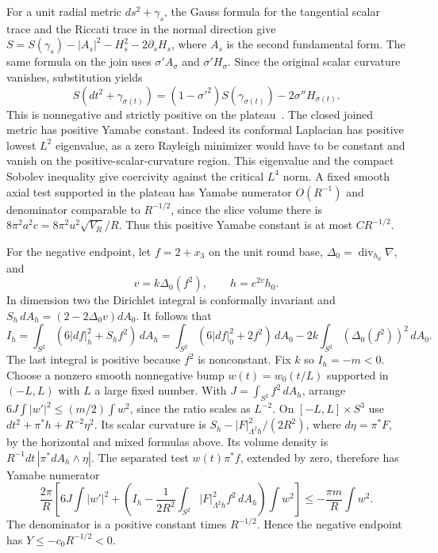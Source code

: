 \documentclass[11pt]{article}
\numberwithin{equation}{section}
\theoremstyle{definition}
\theoremstyle{remark}
\begin{document}
For a unit radial metric \(ds^2+\gamma_s\), the Gauss formula
for the tangential scalar trace and the Riccati trace in the
normal direction give \(S=S(\gamma_s)-|A_s|^2-H_s^2-2\partial_s H_s\),
where \(A_s\) is the second fundamental form. The same formula
on the join uses \(\sigma'A_{\sigma}\) and \(\sigma'H_\sigma\).
Since the original scalar curvature vanishes, substitution yields
\[
 S(dt^2+\gamma_{\sigma(t)})
   =(1-\sigma'^2)S(\gamma_{\sigma(t)})-2\sigma''H_{\sigma(t)} .
\]
This is nonnegative and strictly positive on the plateau~\cite[Lemma 2.4]{EbertFrenck2021Surgery}.
The closed joined metric has positive Yamabe constant. Indeed
its conformal Laplacian has positive lowest \(L^2\) eigenvalue,
as a zero Rayleigh minimizer would have to be constant and
vanish on the positive-scalar-curvature region. This eigenvalue
and the compact Sobolev inequality give coercivity against the
critical \(L^4\) norm. A fixed smooth axial test supported in
the plateau has Yamabe numerator \(O(R^{-1})\) and denominator
comparable to \(R^{-1/2}\), since the slice volume there is
\(8\pi^2 a^2c=8\pi^2u^2\sqrt{V_R}/R\). Thus this positive
Yamabe constant is at most \(C R^{-1/2}\).

For the negative endpoint, let \(f=2+x_3\) on the unit round
base, \(\Delta_0=\operatorname{div}_{h_0}\nabla\), and
\[
 v=k\Delta_0(f^2),\qquad h=e^{2v}h_0.
\]
In dimension two the Dirichlet integral is conformally invariant
and \(S_h\,dA_h=(2-2\Delta_0v)dA_0\). It follows that
\[
 I_h=\int_{S^2}(6|df|_h^2+S_h f^2)\,dA_h
 =\int_{S^2}(6|df|_0^2+2f^2)\,dA_0
       -2k\int_{S^2}(\Delta_0(f^2))^2\,dA_0 .
\]
The last integral is positive because \(f^2\) is nonconstant.
Fix \(k\) so \(I_h=-m<0\). Choose a nonzero smooth nonnegative
bump \(w(t)=w_0(t/L)\) supported in \((-L,L)\) with \(L\) a
large fixed number. With \(J=\int_{S^2}f^2\,dA_h\), arrange
\(6J\int|w'|^2\le(m/2)\int w^2\), since the ratio scales as \(L^{-2}\).
On \([-L,L]\times S^3\) use
\(dt^2+\pi^*h+R^{-2}\eta^2\). Its scalar curvature is
\(S_h-|F|_{\Lambda^2 h}^2/(2R^2)\), where \(d\eta=\pi^*F\), by the
horizontal and mixed formulas above. Its volume density is
\(R^{-1}dt\,|\pi^*dA_h\wedge\eta|\). The separated test
\(w(t)\pi^*f\), extended by zero, therefore has Yamabe numerator
\[
 \frac{2\pi}{R}\left[
  6J\int |w'|^2+
   \left(I_h-\frac1{2R^2}\int_{S^2}|F|_{\Lambda^2 h}^2 f^2\,dA_h\right)
       \int w^2\right]
 \le -\frac{\pi m}{R}\int w^2 .
\]
The denominator is a positive constant times \(R^{-1/2}\).
Hence the negative endpoint has \(Y\le-c_0R^{-1/2}<0\).
\end{document}
